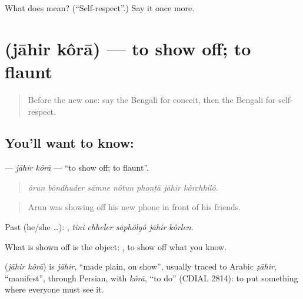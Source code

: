 \begin{tcolorbox}[breakable,colback=teal!4,colframe=teal!35!black,title={Before you move on}]
What does  mean? (\textquotedblleft{}Self-respect\textquotedblright{}.) Say it once more.
\end{tcolorbox}
\section[\texorpdfstring{\bn{জাহির} \bn{করা} (jāhir kôrā)}{জাহির করা (jāhir kôrā)}]{  (jāhir kôrā) — to show off; to flaunt}

\label{lesson:BN-C452-jahir-kora}



\begin{quote}
Before the new one: say the Bengali for conceit, then the Bengali for self-respect.
\end{quote}

\subsection*{You'll want to know:  }
\textbf{ } — \emph{jāhir kôrā} — \textquotedblleft{}to show off; to flaunt\textquotedblright{}.

\begin{quote}
      
\end{quote}

\begin{quote}
\emph{ôrun bôndhuder sāmne nôtun phonṭā jāhir kôrchhilô.}
\end{quote}

\begin{quote}
Arun was showing off his new phone in front of his friends.
\end{quote}

Past (he/she …):     , \emph{tini chheler sāphôlyô jāhir kôrlen}.

What is shown off is the object:   , to show off what you know.

\begin{cousinweb}
\textbf{ } (\emph{jāhir kôrā}) is \emph{jāhir}, \textquotedblleft{}made plain, on show\textquotedblright{}, usually traced to Arabic \emph{ẓāhir}, \textquotedblleft{}manifest\textquotedblright{}, through Persian, with \emph{kôrā}, \textquotedblleft{}to do\textquotedblright{} (CDIAL 2814): to put something where everyone must see it.
\end{cousinweb}

